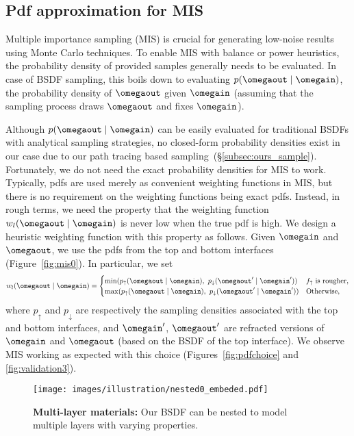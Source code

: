 \subsection{Pdf approximation for MIS}
\label{subsec:ours_global_MIS}
%
Multiple importance sampling (MIS) is crucial for generating low-noise results using Monte Carlo techniques.
To enable MIS with balance or power heuristics, the probability density of provided samples generally needs to be evaluated.
In case of BSDF sampling, this boils down to evaluating $p(\omegaout \;|\; \omegain)$, the probability density of $\omegaout$ given $\omegain$ (assuming that the sampling process draws $\omegaout$ and fixes $\omegain$).

Although $p(\omegaout \;|\; \omegain)$ can be easily evaluated for traditional BSDFs with analytical sampling strategies, no closed-form probability densities exist in our case due to our path tracing based sampling~(\S\ref{subsec:ours_sample}).
Fortunately, we do not need the exact probability densities for MIS to work. Typically, pdfs are used merely as convenient weighting functions in MIS, but there is no requirement on the weighting functions being exact pdfs. Instead, in rough terms, we need the property that the weighting function $w_l(\omegaout \;|\; \omegain)$ is never low when the true pdf is high. We design a heuristic weighting function with this property as follows.
Given $\omegain$ and $\omegaout$, we use the pdfs from the top and bottom interfaces (Figure~\ref{fig:mis0}).
In particular, we set
%
\begin{equation}
w_l(\omegaout \;|\; \omegain) = \begin{cases}
\min(p_\uparrow(\omegaout \;|\; \omegain),\ p_\downarrow(\omegaout' \;|\; \omegain')) & \text{$f_\uparrow$ is rougher},\\
\max(p_\uparrow(\omegaout \;|\; \omegain),\ p_\downarrow(\omegaout' \;|\; \omegain')) & \text{Otherwise},\\
\end{cases}
\end{equation}
%
where $p_\uparrow$ and $p_\downarrow$ are respectively the sampling densities associated with the top and bottom interfaces, and $\omegain'$, $\omegaout'$ are refracted versions of $\omegain$ and $\omegaout$ (based on the BSDF of the top interface). We observe MIS working as expected with this choice (Figures~\ref{fig:pdfchoice} and \ref{fig:validation3}).

\begin{figure}[b]
	\centering
	\texttt{[image: images/illustration/nested0\_embeded.pdf]}
	\caption{\label{fig:nested0}
		\textbf{Multi-layer materials:}
		Our BSDF can be nested to model multiple layers with varying properties.
	}
\end{figure}


